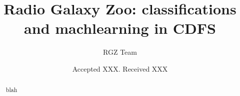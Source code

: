 \documentclass[fleqn,usenatbib,usedcolumn]{mnras}
\title[ML CDFS]{Radio Galaxy Zoo: classifications and machlearning in CDFS}
\author[RGZ Team]{RGZ Team}
\date{Accepted XXX. Received XXX}
\begin{document}
\label{firstpage}
\pagerange{\pageref{firstpage}--\pageref{lastpage}}
\maketitle

\begin{abstract}
blah
\end{abstract}






\bsp	%
\label{lastpage}
\end{document}
